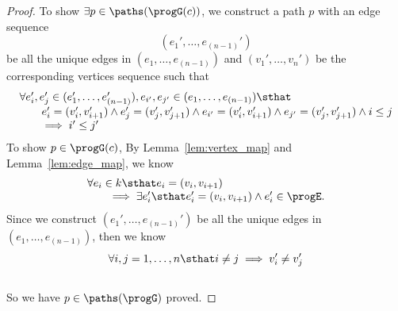 \begin{proof}
\subcaseL{}
To show $\exists p \in \paths(\progG(c)) $,
 we construct a path $p$ with an edge sequence 
 $$(e_1', \ldots, e_{(n-1)}')$$ 
 be all the unique
 edges in $(e_{1}, \ldots, e_{(n-1)})$ and $(v_1', \ldots, v_n')$ 
 be the corresponding vertices sequence such that
 \[
	\begin{array}{l}
	\forall e_i', e_j' \in (e_1', \ldots, e_{(n-1)}'), e_{i'}, e_{j'} \in (e_{1}, \ldots, e_{(n-1)}) \sthat
	\\ \qquad 
	e_i' = (v_i', v_{i+1}') \land e_j' = (v_j', v_{j+1}')
	\land 
	e_{i'} = (v_i', v_{i+1}') \land e_{j'} = (v_j', v_{j+1}')
	\land 
	i \leq j
	\\\qquad 
	\implies
	i' \leq j'
	\end{array}
	\]
To show $p \in \progG(c)$, By Lemma~\ref{lem:vertex_map} and Lemma~\ref{lem:edge_map}, we know
%
\[
\begin{array}{l}
  \forall e_i \in k \sthat  e_i = (v_i, v_{i + 1}) \\
  \qquad \implies
  \exists e_i' \sthat  e_i' = (v_i, v_{i + 1}) \land e_i' \in \progE.
\end{array}
  \]
Since we construct $(e_1', \ldots, e_{(n-1)}')$ be all the unique
edges in $(e_{1}, \ldots, e_{(n-1)})$,
then we know
\[
	\forall i, j = 1, \ldots, n \sthat i \neq j \implies v_i' \neq v_j' 
\]
\\
So we have $p \in \paths(\progG)$ proved.


\end{proof}
